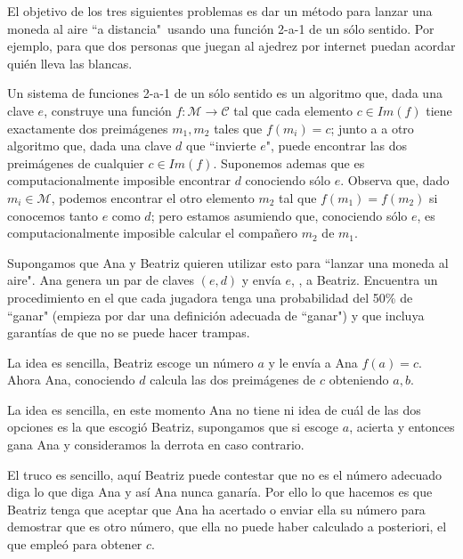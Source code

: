 {\vskip0.3cm}

El objetivo de los tres siguientes problemas es dar un método para lanzar una moneda al aire ``a
 distancia"\
 usando una función 2-a-1 de un sólo sentido. Por ejemplo, para que dos personas que juegan al ajedrez por internet
 puedan acordar quién lleva las blancas.

{\vskip0.2cm}

\begin{problem}[6]
Un sistema de funciones 2-a-1 de un sólo sentido es un algoritmo
que, dada una clave $e$, construye una función $f:\mathcal
M\longrightarrow\mathcal C$ tal que cada elemento $c\in Im(f)$
tiene exactamente dos preimágenes $m_1,m_2$ tales que $f(m_i)=c$;
junto a a otro algoritmo que, dada una clave $d$ que ``invierte
$e$", puede encontrar las dos preimágenes de cualquier $c\in
Im(f)$. Suponemos ademas que es computacionalmente imposible
encontrar $d$ conociendo sólo $e$. Observa que, dado
$m_i\in\mathcal M$, podemos encontrar el otro elemento $m_2$ tal
que $f(m_1)=f(m_2)$ si conocemos tanto $e$ como $d$; pero estamos
asumiendo que, conociendo sólo $e$, es computacionalmente
imposible calcular el compañero $m_2$ de  $m_1$.

Supongamos que Ana y Beatriz quieren utilizar esto para ``lanzar
una moneda al aire". Ana genera un par de claves $(e,d)$ y envía
$e$, \underbar{pero no $d$}, a Beatriz. Encuentra un procedimiento
en el que cada jugadora tenga una probabilidad del 50\% de
``ganar" (empieza por dar una definición adecuada de ``ganar") y
que incluya garantías de que no se puede hacer trampas.
\solution



La idea es sencilla, Beatriz escoge un número $a$ y le envía a Ana $f(a)=c$. Ahora Ana, conociendo $d$ calcula las dos preimágenes de $c$ obteniendo $a,b$. 

La idea es sencilla, en este momento Ana no tiene ni idea de cuál de las dos opciones es la que escogió Beatriz, supongamos que si escoge $a$, acierta y entonces gana Ana y consideramos la derrota en caso contrario.

El truco es sencillo, aquí Beatriz puede contestar que no es el número adecuado diga lo que diga Ana y así Ana nunca ganaría. Por ello lo que hacemos es que Beatriz tenga que aceptar que Ana ha acertado o enviar ella su número para demostrar que es otro número, que ella no puede haber calculado a posteriori, el que empleó para obtener $c$.
\end{problem}


